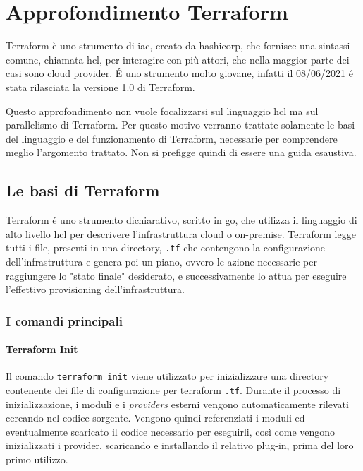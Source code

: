 \documentclass[12pt, a4paper, titlepage]{article}
\begin{document}
\section{Approfondimento Terraform}
Terraform\cite{terraform} è uno strumento di \gls{iac}, creato da \gls{hashicorp}, che fornisce una sintassi comune, chiamata \gls{hcl}, per interagire con più attori, che nella maggior parte dei casi sono cloud provider. É uno strumento molto giovane, infatti il 08/06/2021 é stata rilasciata la versione 1.0 di Terraform.

\begin{tcolorbox}
Questo approfondimento non vuole focalizzarsi sul linguaggio \gls{hcl} ma sul parallelismo di Terraform. Per questo motivo verranno trattate solamente le basi del linguaggio e del funzionamento di Terraform, necessarie per comprendere meglio l'argomento trattato. Non si prefigge quindi di essere una guida esaustiva.
\end{tcolorbox}

\subsection{Le basi di Terraform}
Terraform é uno strumento dichiarativo, scritto in \gls{go}, che utilizza il linguaggio di alto livello \gls{hcl} per descrivere l'infrastruttura cloud o on-premise. Terraform legge tutti i file, presenti in una directory, \texttt{.tf} che contengono la configurazione dell'infrastruttura e genera poi un piano, ovvero le azione necessarie per raggiungere lo "stato finale" desiderato, e successivamente  lo attua per eseguire l'effettivo provisioning dell'infrastruttura.

\subsubsection{I comandi principali}

\paragraph{Terraform Init}
Il comando \texttt{terraform init} viene utilizzato per inizializzare una directory contenente dei file di configurazione per terraform \texttt{.tf}.
Durante il processo di inizializzazione, i moduli e i \textit{providers} esterni vengono automaticamente rilevati cercando nel codice sorgente.  Vengono quindi referenziati i
moduli ed eventualmente scaricato il codice necessario per eseguirli, così come vengono inizializzati i provider, scaricando e installando il relativo plug-in, prima del loro primo utilizzo.
\end{document}
